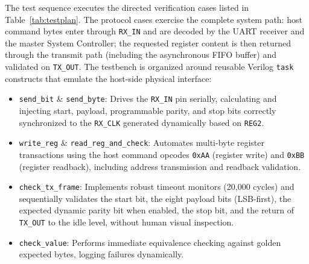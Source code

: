 \documentclass[11pt,a4paper]{article}
\begin{document}
The test sequence executes the directed verification cases listed in Table~\ref{tab:testplan}. The protocol cases exercise the complete system path: host command bytes enter through \texttt{RX\_IN} and are decoded by the UART receiver and the master System Controller; the requested register content is then returned through the transmit path (including the asynchronous FIFO buffer) and validated on \texttt{TX\_OUT}. The testbench is organized around reusable Verilog \texttt{task} constructs that emulate the host-side physical interface:
\begin{itemize}
    \item \texttt{send\_bit} \& \texttt{send\_byte}: Drives the \texttt{RX\_IN} pin serially, calculating and injecting start, payload, programmable parity, and stop bits correctly synchronized to the \texttt{RX\_CLK} generated dynamically based on \texttt{REG2}.
    \item \texttt{write\_reg} \& \texttt{read\_reg\_and\_check}: Automates multi-byte register transactions using the host command opcodes \texttt{0xAA} (register write) and \texttt{0xBB} (register readback), including address transmission and readback validation.
    \item \texttt{check\_tx\_frame}: Implements robust timeout monitors (20,000 cycles) and sequentially validates the start bit, the eight payload bits (LSB-first), the expected dynamic parity bit when enabled, the stop bit, and the return of \texttt{TX\_OUT} to the idle level, without human visual inspection.
    \item \texttt{check\_value}: Performs immediate equivalence checking against golden expected bytes, logging failures dynamically.
\end{itemize}
\end{document}
